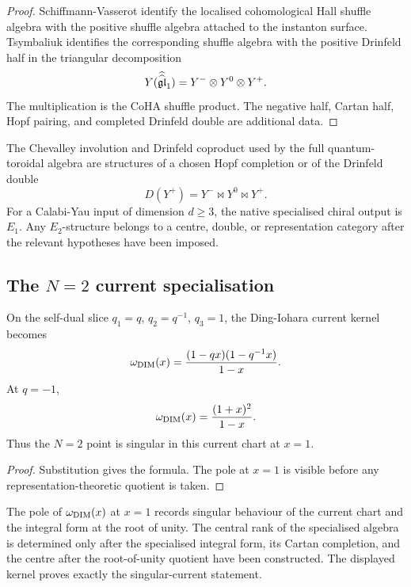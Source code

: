 \begin{proof}
Schiffmann-Vasserot identify the localised cohomological Hall shuffle
algebra with the positive shuffle algebra attached to the instanton
surface.  Tsymbaliuk identifies the corresponding shuffle algebra with
the positive Drinfeld half in the triangular decomposition
\[
  Y(\widehat{\widehat{\mathfrak{gl}}}_1)=Y^-\otimes Y^0\otimes Y^+ .
\]
The multiplication is the CoHA shuffle product.  The negative half,
Cartan half, Hopf pairing, and completed Drinfeld double are additional
data.
\end{proof}

\begin{corollary}
\label{cor:qtet-positive-half-no-hopf}
The Chevalley involution and Drinfeld coproduct used by the full
quantum-toroidal algebra are structures of a chosen Hopf completion or
of the Drinfeld double
\[
  D(Y^+)=Y^-\bowtie Y^0\bowtie Y^+ .
\]
For a Calabi-Yau input of dimension \(d\geq3\), the native
specialised chiral output is \(E_1\).  Any \(E_2\)-structure belongs
to a centre, double, or representation category after the relevant
hypotheses have been imposed.
\end{corollary}

\subsection{The \texorpdfstring{$N=2$}{N=2} current specialisation}
\label{subsec:qtet-n2-current}

\begin{proposition}[The current kernel at \texorpdfstring{$q=-1$}{q=-1}]
\label{prop:qtet-n2-current-kernel}
On the self-dual slice \(q_1=q\), \(q_2=q^{-1}\), \(q_3=1\), the
Ding-Iohara current kernel becomes
\[
  \omega_{\mathrm{DIM}}(x)
  =
  \frac{(1-qx)(1-q^{-1}x)}{1-x}.
\]
At \(q=-1\),
\[
  \omega_{\mathrm{DIM}}(x)=\frac{(1+x)^2}{1-x}.
\]
Thus the \(N=2\) point is singular in this current chart at \(x=1\).
\end{proposition}

\begin{proof}
Substitution gives the formula.  The pole at \(x=1\) is visible before
any representation-theoretic quotient is taken.
\end{proof}

\begin{remark}
\label{rem:qtet-central-rank-integral-form}
The pole of \(\omega_{\mathrm{DIM}}(x)\) at \(x=1\) records singular behaviour
of the current chart and the integral form at the root of unity.  The
central rank of the specialised algebra is determined only after the
specialised integral form, its Cartan completion, and the centre after
the root-of-unity quotient have been constructed.  The displayed kernel
proves exactly the singular-current statement.
\end{remark}

